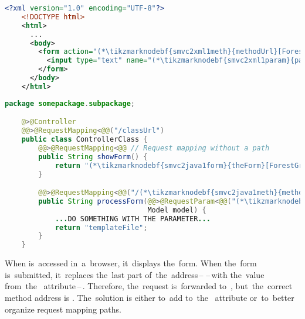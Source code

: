 \begin{lstlisting}[language=XML, title={Simple HTML form \tikzmarknodebf{smvc2xml1form}{\textit{theForm}}\textit{.html}}]
    <?xml version="1.0" encoding="UTF-8"?>
    <!DOCTYPE html>
    <html>
      ...
      <body>
        <form action="(*\tikzmarknodebf{smvc2xml1meth}{methodUrl}[ForestGreen]*)" method="post">
          <input type="text" name="(*\tikzmarknodebf{smvc2xml1param}{paramKey}[ForestGreen]*)">
        </form>
      </body>
    </html>
\end{lstlisting}
\begin{lstlisting}[language=Java, title={Controller class}]
    package somepackage.subpackage;

    @>@Controller
    @@>@RequestMapping<@@("/classUrl")
    public class ControllerClass {
        @@>@RequestMapping<@@ // Request mapping without a path
        public String showForm() {
            return "(*\tikzmarknodebf{smvc2java1form}{theForm}[ForestGreen]*)"
        }

        @@>@RequestMapping<@@("/(*\tikzmarknodebf{smvc2java1meth}{methodUrl}[ForestGreen]*)")
        public String processForm(@@>@RequestParam<@@("(*\tikzmarknodebf{smvc2java1param}{paramKey}[ForestGreen]*)") String singleParameter,
                                  Model model) {
            ...DO SOMETHING WITH THE PARAMETER...
            return "templateFile";
        }
    }
\end{lstlisting}

\noindent When  is~accessed in~a~browser, it~displays the~form.
When the~form is~submitted, it~replaces the~last part of~the~address\,--\,\,--\,with the~value from~the~ attribute\,--\,.
Therefore, the~request is~forwarded to~, but~the~correct method address is .
The~solution is either to~add  to~the~ attribute or~to~better organize request mapping paths.
